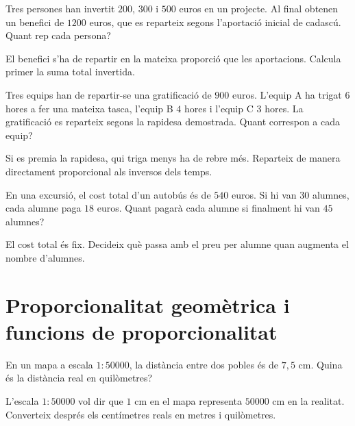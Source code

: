 \begin{exercici}
	Tres persones han invertit \(200\), \(300\) i \(500\) euros en un projecte. Al final obtenen un benefici de \(1200\) euros, que es reparteix segons l'aportació inicial de cadascú. Quant rep cada persona?
\end{exercici}

\begin{indicacio}
	El benefici s'ha de repartir en la mateixa proporció que les aportacions. Calcula primer la suma total invertida.
\end{indicacio}

\begin{exercici}
	Tres equips han de repartir-se una gratificació de \(900\) euros. L'equip A ha trigat \(6\) hores a fer una mateixa tasca, l'equip B \(4\) hores i l'equip C \(3\) hores. La gratificació es reparteix segons la rapidesa demostrada. Quant correspon a cada equip?
\end{exercici}

\begin{indicacio}
	Si es premia la rapidesa, qui triga menys ha de rebre més. Reparteix de manera directament proporcional als inversos dels temps.
\end{indicacio}

\begin{exercici}
	En una excursió, el cost total d'un autobús és de \(540\) euros. Si hi van \(30\) alumnes, cada alumne paga \(18\) euros. Quant pagarà cada alumne si finalment hi van \(45\) alumnes?
\end{exercici}

\begin{indicacio}
	El cost total és fix. Decideix què passa amb el preu per alumne quan augmenta el nombre d'alumnes.
\end{indicacio}

\section{Proporcionalitat geomètrica i funcions de proporcionalitat}

\begin{exercici}[Escales]
	En un mapa a escala \(1:50000\), la distància entre dos pobles és de \(7{,}5\) cm. Quina és la distància real en quilòmetres?
\end{exercici}

\begin{indicacio}
	L'escala \(1:50000\) vol dir que \(1\) cm en el mapa representa \(50000\) cm en la realitat. Converteix després els centímetres reals en metres i quilòmetres.
\end{indicacio}

